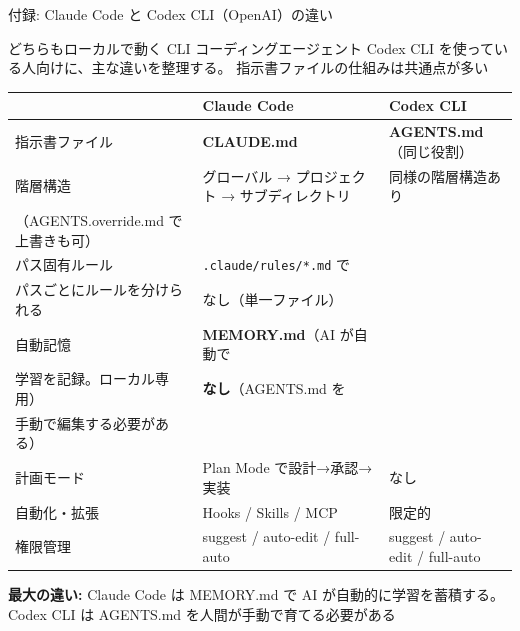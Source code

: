 \documentclass[aspectratio=169, 14pt]{beamer}
\begin{document}
\begin{frame}{付録: Claude Code と Codex CLI（OpenAI）の違い}
  \begin{block}{どちらもローカルで動く CLI コーディングエージェント}
    {\small Codex CLI を使っている人向けに、主な違いを整理する。
    指示書ファイルの仕組みは共通点が多い}
  \end{block}

  \begin{table}
    \centering\tiny
    \begin{tabular}{lp{37mm}p{37mm}}
      \hline
      & \textbf{Claude Code} & \textbf{Codex CLI} \\
      \hline
      指示書ファイル &
        \textbf{CLAUDE.md} &
        \textbf{AGENTS.md}（同じ役割） \\
      階層構造 &
        グローバル → プロジェクト → サブディレクトリ &
        同様の階層構造あり\\（AGENTS.override.md で上書きも可） \\
      パス固有ルール &
        \texttt{.claude/rules/*.md} で\\パスごとにルールを分けられる &
        なし（単一ファイル） \\
      自動記憶 &
        \textbf{MEMORY.md}（AI が自動で\\学習を記録。ローカル専用） &
        \textbf{なし}（AGENTS.md を\\手動で編集する必要がある） \\
      計画モード &
        Plan Mode で設計→承認→実装 &
        なし \\
      自動化・拡張 &
        Hooks / Skills / MCP &
        限定的 \\
      権限管理 &
        suggest / auto-edit / full-auto &
        suggest / auto-edit / full-auto \\
      \hline
    \end{tabular}
  \end{table}

  {\scriptsize \textbf{最大の違い:}
    Claude Code は MEMORY.md で AI が自動的に学習を蓄積する。
    Codex CLI は AGENTS.md を人間が手動で育てる必要がある}
\end{frame}
\end{document}
